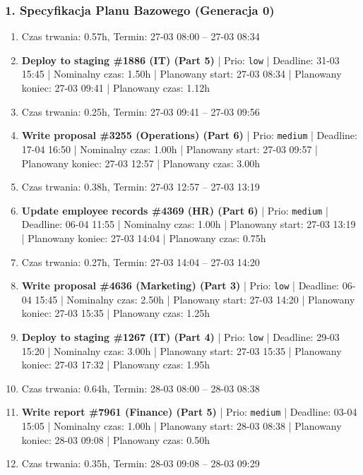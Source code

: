 \subsubsection*{1. Specyfikacja Planu Bazowego (Generacja 0)}
{\small
\begin{enumerate}
  \item [\textbf{PRZERWA}] Czas trwania: 0.57h, Termin: 27-03 08:00 -- 27-03 08:34
  \item [\textbf{14697}] \textbf{Deploy to staging \#1886 (IT) (Part 5)} | Prio: \texttt{low} | Deadline: 31-03 15:45 | Nominalny czas: 1.50h | Planowany start: 27-03 08:34 | Planowany koniec: 27-03 09:41 | Planowany czas: 1.12h
  \item [\textbf{PRZERWA}] Czas trwania: 0.25h, Termin: 27-03 09:41 -- 27-03 09:56
  \item [\textbf{14654}] \textbf{Write proposal \#3255 (Operations) (Part 6)} | Prio: \texttt{medium} | Deadline: 17-04 16:50 | Nominalny czas: 1.00h | Planowany start: 27-03 09:57 | Planowany koniec: 27-03 12:57 | Planowany czas: 3.00h
  \item [\textbf{PRZERWA}] Czas trwania: 0.38h, Termin: 27-03 12:57 -- 27-03 13:19
  \item [\textbf{14658}] \textbf{Update employee records \#4369 (HR) (Part 6)} | Prio: \texttt{medium} | Deadline: 06-04 11:55 | Nominalny czas: 1.00h | Planowany start: 27-03 13:19 | Planowany koniec: 27-03 14:04 | Planowany czas: 0.75h
  \item [\textbf{PRZERWA}] Czas trwania: 0.27h, Termin: 27-03 14:04 -- 27-03 14:20
  \item [\textbf{14684}] \textbf{Write proposal \#4636 (Marketing) (Part 3)} | Prio: \texttt{low} | Deadline: 06-04 15:45 | Nominalny czas: 2.50h | Planowany start: 27-03 14:20 | Planowany koniec: 27-03 15:35 | Planowany czas: 1.25h
  \item [\textbf{14686}] \textbf{Deploy to staging \#1267 (IT) (Part 4)} | Prio: \texttt{low} | Deadline: 29-03 15:20 | Nominalny czas: 3.00h | Planowany start: 27-03 15:35 | Planowany koniec: 27-03 17:32 | Planowany czas: 1.95h
  \item [\textbf{PRZERWA}] Czas trwania: 0.64h, Termin: 28-03 08:00 -- 28-03 08:38
  \item [\textbf{14657}] \textbf{Write report \#7961 (Finance) (Part 5)} | Prio: \texttt{medium} | Deadline: 03-04 15:05 | Nominalny czas: 1.00h | Planowany start: 28-03 08:38 | Planowany koniec: 28-03 09:08 | Planowany czas: 0.50h
  \item [\textbf{PRZERWA}] Czas trwania: 0.35h, Termin: 28-03 09:08 -- 28-03 09:29

\end{enumerate}}
